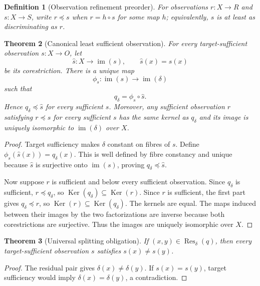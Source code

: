 \documentclass[10pt]{article}
\newtheorem{definition}{Definition}[section]
\newtheorem{theorem}[definition]{Theorem}
\newcommand{\Res}{\operatorname{Res}}
\newcommand{\Ker}{\operatorname{Ker}}
\begin{document}
\begin{definition}[Observation refinement preorder]
For observations $r:X\to R$ and $s:X\to S$, write $r\preceq s$ when $r=h\circ s$ for some map $h$; equivalently, $s$ is at least as discriminating as $r$.
\end{definition}

\begin{theorem}[Canonical least sufficient observation]\label{thm:canonical}
For every target-sufficient observation $s:X\to O$, let
\[
  \widehat s:X\to\operatorname{im}(s),\qquad
  \widehat s(x)=s(x)
\]
be its corestriction.  There is a unique map
\[
  \phi_s:\operatorname{im}(s)\to\operatorname{im}(\delta)
\]
such that
\[
  q_\delta=\phi_s\circ\widehat s.
\]
Hence $q_\delta\preceq\widehat s$ for every sufficient $s$.  Moreover, any sufficient observation $r$ satisfying $r\preceq s$ for every sufficient $s$ has the same kernel as $q_\delta$ and its image is uniquely isomorphic to $\operatorname{im}(\delta)$ over $X$.
\end{theorem}

\begin{proof}
Target sufficiency makes $\delta$ constant on fibres of $s$.  Define $\phi_s(\widehat s(x))=q_\delta(x)$.  This is well defined by fibre constancy and unique because $\widehat s$ is surjective onto $\operatorname{im}(s)$, proving $q_\delta\preceq\widehat s$.

Now suppose $r$ is sufficient and below every sufficient observation.  Since $q_\delta$ is sufficient, $r\preceq q_\delta$, so $\Ker(q_\delta)\subseteq\Ker(r)$.  Since $r$ is sufficient, the first part gives $q_\delta\preceq r$, so $\Ker(r)\subseteq\Ker(q_\delta)$.  The kernels are equal.  The maps induced between their images by the two factorizations are inverse because both corestrictions are surjective.  Thus the images are uniquely isomorphic over $X$.
\end{proof}

\begin{theorem}[Universal splitting obligation]\label{thm:splitting}
If $(x,y)\in\Res_\delta(q)$, then every target-sufficient observation $s$ satisfies $s(x)\neq s(y)$.
\end{theorem}

\begin{proof}
The residual pair gives $\delta(x)\neq\delta(y)$.  If $s(x)=s(y)$, target sufficiency would imply $\delta(x)=\delta(y)$, a contradiction.
\end{proof}
\end{document}
